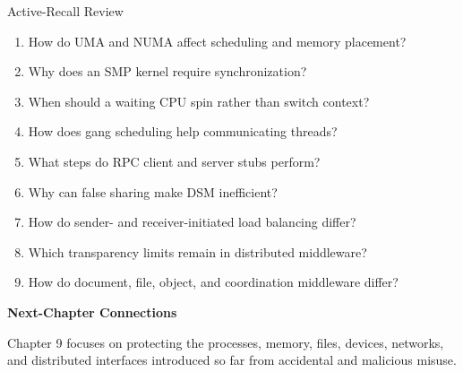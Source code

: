 \documentclass[10pt,letterpaper]{article}
\begin{document}
\enlargethispage{2\baselineskip}
\begin{studybox}{Active-Recall Review}
\small
\begin{enumerate}
  \item How do UMA and NUMA affect scheduling and memory placement?
  \item Why does an SMP kernel require synchronization?
  \item When should a waiting CPU spin rather than switch context?
  \item How does gang scheduling help communicating threads?
  \item What steps do RPC client and server stubs perform?
  \item Why can false sharing make DSM inefficient?
  \item How do sender- and receiver-initiated load balancing differ?
  \item Which transparency limits remain in distributed middleware?
  \item How do document, file, object, and coordination middleware differ?
\end{enumerate}
\end{studybox}

\par\medskip
{\color{navy}\bfseries Next-Chapter Connections}\par\smallskip
Chapter 9 focuses on protecting the processes, memory, files, devices, networks, and distributed interfaces introduced so far from accidental and malicious misuse.
\normalsize
\end{document}
